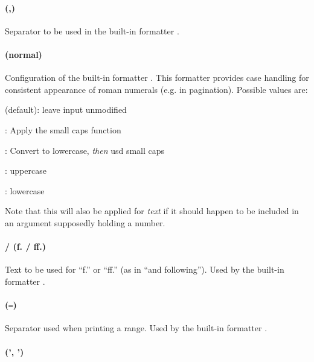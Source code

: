 \documentclass[12pt]{scrartcl}
\begin{document}
\paragraph{ (,)}

Separator to be used in the built-in formatter .


\paragraph{ (normal)}

Configuration of the built-in formatter .  This formatter
provides case handling for consistent appearance of roman numerals (e.g. in
pagination).  Possible values are:

\begin{itemize*}
	\item {} (default): leave input unmodified
	\item {}: Apply the small caps function
	\item {}: Convert to lowercase, \emph{then} usd small caps
	\item {}: uppercase
	\item {}: lowercase
\end{itemize*}

\noindent Note that this will also be applied for \emph{text} if it should
happen to be included in an argument supposedly holding a number.

\paragraph{ /  (f. / ff.)}

Text to be used for “f.” or “ff.” (as in “and following”).  Used by the built-in formatter .


\paragraph{ (\texttt{--})}

Separator used when printing a range.  Used by the built-in formatter .


\paragraph{ (', ')}
\end{document}
